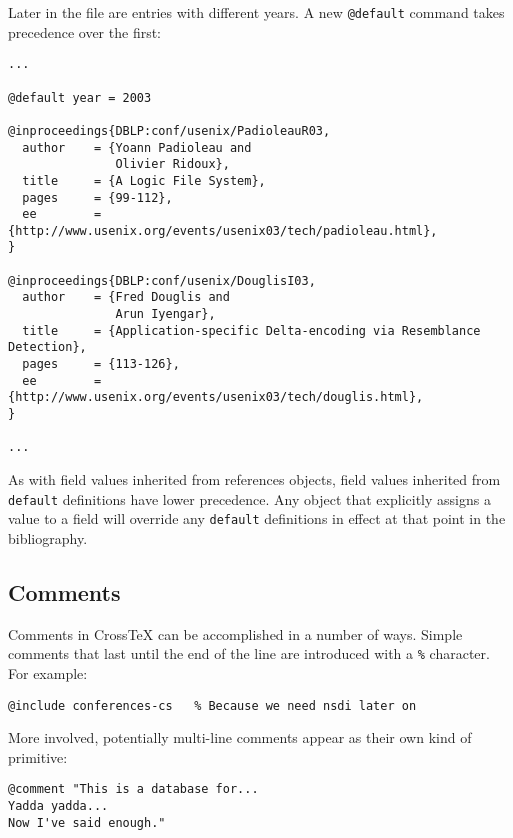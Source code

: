 \documentclass{article}
\newcommand{\XTX}{Cross\TeX}
\begin{document}
Later in the file are entries with different years. A new
\texttt{@default} command takes precedence over the first:

\begin{small}\begin{verbatim}
...

@default year = 2003

@inproceedings{DBLP:conf/usenix/PadioleauR03,
  author    = {Yoann Padioleau and
               Olivier Ridoux},
  title     = {A Logic File System},
  pages     = {99-112},
  ee        = {http://www.usenix.org/events/usenix03/tech/padioleau.html},
}

@inproceedings{DBLP:conf/usenix/DouglisI03,
  author    = {Fred Douglis and
               Arun Iyengar},
  title     = {Application-specific Delta-encoding via Resemblance Detection},
  pages     = {113-126},
  ee        = {http://www.usenix.org/events/usenix03/tech/douglis.html},
}

...
\end{verbatim}\end{small}

As with field values inherited from references objects, field values
inherited from \texttt{default} definitions have lower precedence. Any
object that explicitly assigns a value to a field will override any
\texttt{default} definitions in effect at that point in the bibliography.

\subsection{Comments}

Comments in \XTX{} can be accomplished in a number of ways.  Simple comments
that last until the end of the line are introduced with a \texttt{\%} character.
For example:

\begin{small}\begin{verbatim}
@include conferences-cs   % Because we need nsdi later on
\end{verbatim}\end{small}

More involved, potentially multi-line comments appear as their own kind of
primitive:

\begin{small}\begin{verbatim}
@comment "This is a database for...
Yadda yadda...
Now I've said enough."
\end{verbatim}\end{small}
\end{document}
